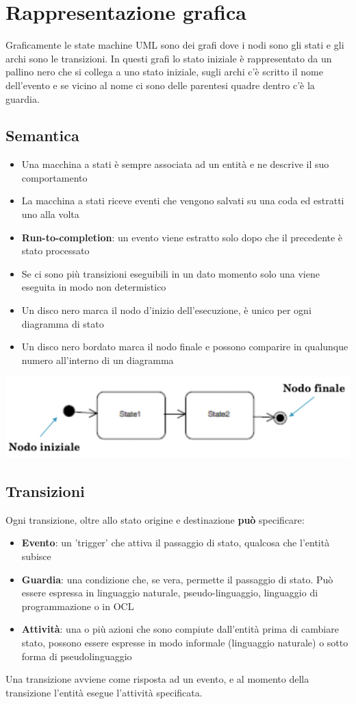 \documentclass[12pt, a4paper]{report}
\begin{document}
\section{Rappresentazione grafica}
Graficamente le state machine UML sono dei grafi dove i nodi sono gli stati e gli archi sono le transizioni. In questi grafi lo stato iniziale è rappresentato da un pallino nero che si collega a uno stato iniziale, sugli archi c'è scritto il nome dell'evento e se vicino al nome ci sono delle parentesi quadre dentro c'è la guardia.
\subsection{Semantica}
\begin{itemize}
    \item Una macchina a stati è sempre associata ad un entità e ne descrive il suo comportamento
    \item La macchina a stati riceve eventi che vengono salvati su una coda ed estratti uno alla volta
    \item \textbf{Run-to-completion}: un evento viene estratto solo dopo che il precedente è stato processato
    \item Se ci sono più transizioni eseguibili in un dato momento solo una viene eseguita in modo non determistico
    \item Un disco nero marca il nodo d'inizio dell'esecuzione, è unico per ogni diagramma di stato
    \item Un disco nero bordato marca il nodo finale e possono comparire in qualunque numero all'interno di un diagramma
\end{itemize}
\begin{center}
    \includegraphics[width=.7\textwidth]{Immagini/UMLStateMachine.png}
\end{center}
\subsection{Transizioni}
Ogni transizione, oltre allo stato origine e destinazione \textbf{può} specificare:
\begin{itemize}
    \item \textbf{Evento}: un 'trigger' che attiva il passaggio di stato, qualcosa che l'entità subisce
    \item \textbf{Guardia}: una condizione che, se vera, permette il passaggio di stato. Può essere espressa in linguaggio naturale, pseudo-linguaggio, linguaggio di programmazione o in OCL
    \item \textbf{Attività}: una o più azioni che sono compiute dall'entità prima di cambiare stato, possono essere espresse in modo informale (linguaggio naturale) o sotto forma di pseudolinguaggio
\end{itemize}
Una transizione avviene come risposta ad un evento, e al momento della transizione l'entità esegue l'attività specificata.
\end{document}
